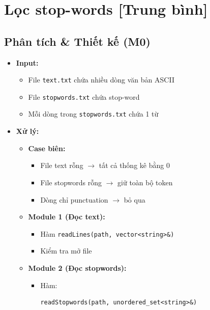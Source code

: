 \section{Lọc stop-words [Trung bình]}
\subsection{Phân tích \& Thiết kế (M0)}

\begin{itemize}

    \item \textbf{Input:}

    \begin{itemize}
        \item File \texttt{text.txt} chứa nhiều dòng văn bản ASCII
        \item File \texttt{stopwords.txt} chứa stop-word
        \item Mỗi dòng trong \texttt{stopwords.txt} chứa 1 từ
    \end{itemize}

    \item \textbf{Xử lý:}

    \begin{itemize}

        \item \textbf{Case biên:}

        \begin{itemize}
            \item File text rỗng $\rightarrow$ tất cả thống kê bằng 0
            \item File stopwords rỗng $\rightarrow$ giữ toàn bộ token
            \item Dòng chỉ punctuation $\rightarrow$ bỏ qua
        \end{itemize}

        \item \textbf{Module 1 (Đọc text):}

        \begin{itemize}
            \item Hàm \texttt{readLines(path, vector<string>\&)}
            \item Kiểm tra mở file
        \end{itemize}

        \item \textbf{Module 2 (Đọc stopwords):}

        \begin{itemize}
            \item Hàm:
\begin{lstlisting}
readStopwords(path, unordered_set<string>&)
\end{lstlisting}


\end{itemize}
\end{itemize}
\end{itemize}
